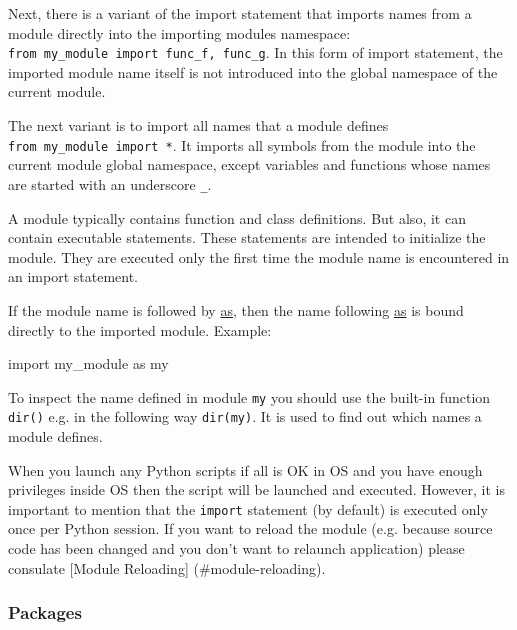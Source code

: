 \documentclass[
]{article}
\newenvironment{Shaded}{}{}
\newcommand{\ImportTok}[1]{#1}
\newcommand{\NormalTok}[1]{#1}
\begin{document}
Next, there is a variant of the import statement that imports names from
a module directly into the importing modules namespace:\\
\texttt{from\ my\_module\ import\ func\_f,\ func\_g}. In this form of
import statement, the imported module name itself is not introduced into
the global namespace of the current module.

The next variant is to import all names that a module defines
\texttt{from\ my\_module\ import\ *}. It imports all symbols from the
module into the current module global namespace, except variables and
functions whose names are started with an underscore \texttt{\_}.

A module typically contains function and class definitions. But also, it
can contain executable statements. These statements are intended to
initialize the module. They are executed only the first time the module
name is encountered in an import statement.

If the module name is followed by
\href{https://docs.python.org/3/reference/simple_stmts.html\#the-import-statement}{as},
then the name following
\href{https://docs.python.org/3/reference/simple_stmts.html\#the-import-statement}{as}
is bound directly to the imported module. Example:

\begin{Shaded}
\begin{Highlighting}[]
\ImportTok{import}\NormalTok{ my\_module }\ImportTok{as}\NormalTok{ my}
\end{Highlighting}
\end{Shaded}

To inspect the name defined in module \texttt{my} you should use the
built-in function \texttt{dir()} e.g. in the following way
\texttt{dir(my)}. It is used to find out which names a module defines.

When you launch any Python scripts if all is OK in OS and you have
enough privileges inside OS then the script will be launched and
executed. However, it is important to mention that the \texttt{import}
statement (by default) is executed only once per Python session. If you
want to reload the module (e.g. because source code has been changed and
you don't want to relaunch application) please consulate {[}Module
Reloading{]} (\#module-reloading).

\hypertarget{packages}{%
\subsubsection{Packages}\label{packages}}
\end{document}
